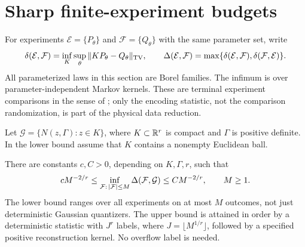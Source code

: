 \section{Sharp finite-experiment budgets}\label{sec:v7-finite-experiments}
For experiments $\mathcal E=\{P_\theta\}$ and $\mathcal F=\{Q_\theta\}$
with the same parameter set, write
\[
 \delta(\mathcal E,\mathcal F)=\inf_K\sup_\theta
             \|KP_\theta-Q_\theta\|_{\rm TV},\qquad
 \Delta(\mathcal E,\mathcal F)=
             \max\{\delta(\mathcal E,\mathcal F),
                    \delta(\mathcal F,\mathcal E)\}.
\]
All parameterized laws in this section are Borel families.
The infimum is over parameter-independent Markov kernels. These are
terminal experiment comparisons in the sense of
\cite{LeCamYang2000,Torgersen1991}; only the encoding statistic, not the
comparison randomization, is part of the physical data reduction.

Let $\mathcal G=\{N(z,\Gamma):z\in K\}$, where
$K\subset\mathbb R^r$ is compact and $\Gamma$ is positive definite. In the
lower bound assume that $K$ contains a nonempty Euclidean ball.

\begin{theorem}
\label{thm:v7-gaussian-budget}
There are constants $c,C>0$, depending on $K,\Gamma,r$, such that
\begin{equation}
 cM^{-2/r}\le
 \inf_{\mathcal F:\,|\mathcal F|\le M}\Delta(\mathcal F,\mathcal G)
 \le CM^{-2/r},\qquad M\ge1.                            \label{eq:v7-gaussian-budget}
\end{equation}
The lower bound ranges over all experiments on at most $M$ outcomes,
not just deterministic Gaussian quantizers. The upper bound is attained
in order by a deterministic statistic with $J^r$ labels, where
$J=\lfloor M^{1/r}\rfloor$, followed by a specified positive
reconstruction kernel. No overflow label is needed.
\end{theorem}

